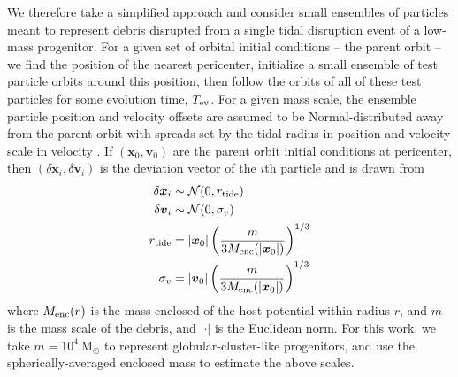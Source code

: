 \documentclass[letterpaper,12pt,preprint]{aastex}
\newcommand{\msun}{\mathrm{M}_\odot}
\newcommand{\bs}[1]{\boldsymbol{#1}}
\begin{document}
We therefore take a simplified approach and consider small ensembles of particles meant to represent debris disrupted from a single tidal disruption event of a low-mass progenitor. For a given set of orbital initial conditions -- the parent orbit -- we find the position of the nearest pericenter, initialize a small ensemble of test particle orbits around this position, then follow the orbits of all of these test particles for some evolution time, $T_{\rm ev}$. For a given mass scale, the ensemble particle position and velocity offsets are assumed to be Normal-distributed away from the parent orbit with spreads set by the tidal radius in position and velocity scale in velocity \citep[e.g.,][]{johnston98, apw14}. If $(\bs{x}_0,\bs{v}_0)$ are the parent orbit initial conditions at pericenter, then $(\delta\bs{x}_i,\delta\bs{v}_i)$ is the deviation vector of the $i$th particle and is drawn from
\begin{align}
	\delta\bs{x}_i &\sim \mathcal{N}(0, r_{\rm tide})\\
	\delta\bs{v}_i &\sim \mathcal{N}(0, \sigma_v)\\
	r_{\rm tide} &=|\bs{x}_0| \left(\frac{m}{3M_{\rm enc}(|\bs{x}_0|)}\right)^{1/3} \\
	\sigma_v &= |\bs{v}_0|\left(\frac{m}{3M_{\rm enc}(|\bs{x}_0|)}\right)^{1/3} 
\end{align}
where $M_{\rm enc}(r)$ is the mass enclosed of the host potential within radius $r$, and $m$ is the mass scale of the debris, and $|\cdot |$ is the Euclidean norm. For this work, we take $m=10^4~\msun$ to represent globular-cluster-like progenitors, and use the spherically-averaged enclosed mass to estimate the above scales.
\end{document}
